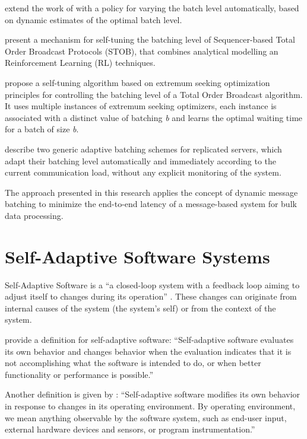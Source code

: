 \cite{Bartoli:2003ts} extend the work of \cite{Friedman:1997aa} with a policy for varying the batch level automatically, based on dynamic estimates of the optimal batch level.

\cite{Romano:2012aa} present a mechanism for self-tuning the batching level of Sequencer-based Total Order Broadcast Protocols (STOB), that combines analytical modelling an Reinforcement Learning (RL) techniques.

\cite{Didona:2012aa} propose a self-tuning algorithm based on extremum seeking optimization principles for controlling the batching level of a Total Order Broadcast algorithm. It uses multiple instances of extremum seeking optimizers, each instance is associated with a distinct value of batching \emph{b} and learns the optimal waiting time for a batch of size \emph{b}.

\cite{Friedman:2006aa} describe two generic adaptive batching schemes for replicated servers, which adapt their batching level automatically and immediately according to the current communication load, without any explicit monitoring of the system.

The approach presented in this research applies the concept of dynamic message batching to minimize the end-to-end latency of a message-based system for bulk data processing.

\section{Self-Adaptive Software Systems}

Self-Adaptive Software is a ``a closed-loop system with a feedback loop aiming to adjust itself to changes during its operation'' \citep{Salehie:2009pi}. These changes can originate from internal causes of the system (the system's self) or from the context of the system.

\citet{Laddaga:2008ff} provide a definition for self-adaptive software: ``Self-adaptive software evaluates its own behavior and chan\-ges behavior when the evaluation indicates that it is not accomplishing what the software is intended to do, or when better functionality or performance is possible.'' 

Another definition is given by \citet{Oreizy:1999lh}: ``Self-adaptive software modifies its own behavior in response to changes in its operating environment. By operating environment, we mean anything observable by the software system, such as end-user input, external hardware devices and sensors, or program instrumentation.''

